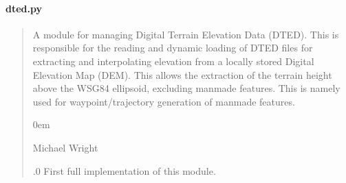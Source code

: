 \documentclass[letterpaper,10pt,english]{sphinxmanual}
\begin{document}
\paragraph{dted.py}
\label{\detokenize{modules/earth/dted:dted-py}}\begin{quote}\begin{description}
\sphinxAtStartPar
A module for managing Digital Terrain Elevation Data (DTED).
This is responsible for the reading and dynamic loading of DTED files for
extracting and interpolating elevation from a locally stored Digital
Elevation Map (DEM). This allows the extraction of the terrain height
above the WSG84 ellipsoid, excluding man\sphinxhyphen{}made features. This is namely
used for waypoint/trajectory generation of man\sphinxhyphen{}made features.

\begin{DUlineblock}{0em}
\item[] Michael Wright \sphinxhyphen{} 
\end{DUlineblock}

.0 \sphinxhyphen{} First full implementation of this module.

\end{description}\end{quote}
\end{document}

